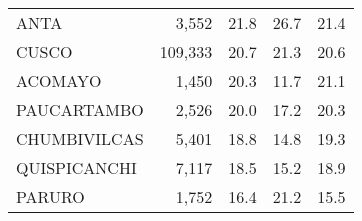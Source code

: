 \begin{tabular}{lrrrr}
	\cellcolor[HTML]{FD6864}ANTA                                       & 3,552                                                                 & 21.8                                                                             & 26.7                                                                        & 21.4                                                                                \\
	\cellcolor[HTML]{FD6864}CUSCO                                      & 109,333                                                               & 20.7                                                                             & 21.3                                                                        & 20.6                                                                                \\
	\cellcolor[HTML]{FD6864}ACOMAYO                                    & 1,450                                                                 & 20.3                                                                             & 11.7                                                                        & 21.1                                                                                \\
	\cellcolor[HTML]{FD6864}PAUCARTAMBO                                & 2,526                                                                 & 20.0                                                                             & 17.2                                                                        & 20.3                                                                                \\
	\cellcolor[HTML]{FD6864}CHUMBIVILCAS                               & 5,401                                                                 & 18.8                                                                             & 14.8                                                                        & 19.3                                                                                \\
	\cellcolor[HTML]{FFCC67}QUISPICANCHI                               & 7,117                                                                 & 18.5                                                                             & 15.2                                                                        & 18.9                                                                                \\
	\cellcolor[HTML]{FFCC67}PARURO                                     & 1,752                                                                 & 16.4                                                                             & 21.2                                                                        & 15.5                                                                                \\

\end{tabular}
